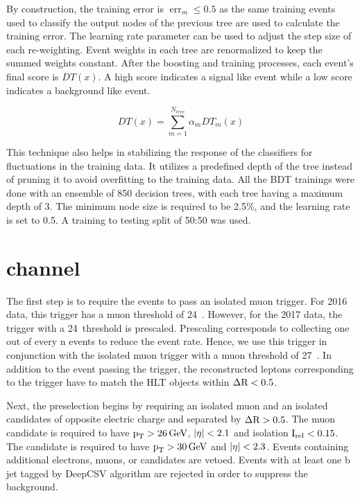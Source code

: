 By construction, the training error is $\operatorname{err}_{m} \leq 0.5$ as the same training events used to classify the output nodes of the previous tree are used to calculate the training error. The learning rate parameter can be used to adjust the step size of each re-weighting. Event weights in each tree are renormalized to keep the summed weights constant. After the boosting and training processes, each event's final score is $DT(x)$. A high score indicates a signal like event while a low score indicates a background like event.

\begin{equation}
DT(x)=\sum_{m=1}^{N_{tree}} \alpha_{m} DT_{m}(x)
\end{equation}

This technique also helps in stabilizing the response of the classifiers for fluctuations in the training data. It utilizes a predefined depth of the tree instead of pruning it to avoid overfitting to the training data. All the BDT trainings were done with an ensemble of 850 decision trees, with each tree having a maximum depth of 3. The minimum node size is required to be 2.5\%, and the learning rate is set to 0.5. A training to testing split of 50:50 was used.

\section{\texorpdfstring{\Hmuhad}{Hmutauh} channel}
The first step is to require the events to pass an isolated muon trigger. For 2016 data, this trigger has a muon \pt threshold of 24~\GeV. However, for the 2017 data, the trigger with a 24~\GeV threshold is prescaled. Prescaling corresponds to collecting one out of every n events to reduce the event rate. Hence, we use this trigger in conjunction with the isolated muon trigger with a muon \pt threshold of 27~\GeV. In addition to the event passing the trigger, the reconstructed leptons corresponding to the trigger have to match the HLT objects within $\Delta \text{R} < 0.5$.

Next, the preselection begins by requiring an isolated muon and an isolated \tauh candidates of opposite electric charge and separated by $\Delta \text{R} > 0.5$. The muon candidate is required to have $\text{p}_\text{T} > 26 \,\text{Ge\hspace{-.08em}V}$, $\lvert\eta\rvert < 2.1$ and isolation $\text{I}_\text{rel} < 0.15$. The \tauh candidate is required to have $\text{p}_\text{T} > 30 \,\text{Ge\hspace{-.08em}V}$ and $\lvert\eta\rvert < 2.3$. Events containing additional electrons, muons, or \tauh candidates are vetoed. Events with at least one b jet tagged by DeepCSV algorithm are rejected in order to suppress the \ttbar background.

